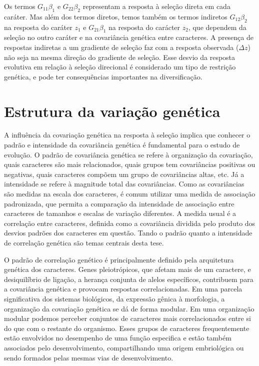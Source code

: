 \begin{refsection}
Os termos $G_{11}\beta_{1}$ e $G_{22}\beta_{2}$ representam a resposta à
seleção direta em cada caráter. Mas além dos termos diretos, temos também  os
termos indiretos $G_{12}\beta_{2}$ na resposta do caráter $z_1$ e
$G_{21}\beta_{1}$ na resposta do carácter $z_2$, que dependem da seleção no
outro caráter e na covariância genética entre caracteres. A presença de
respostas indiretas a um gradiente de seleção faz com a resposta observada
($\Delta z$) não seja na mesma direção do gradiente de seleção. Esse desvio da
resposta evolutiva em relação à seleção direcional é considerado um tipo de
restrição genética, e pode ter consequências importantes na diversificação.

\section{Estrutura da variação genética}

A influência da covariação genética na resposta à seleção implica que conhecer
o padrão e intensidade da covariância genética é fundamental para o estudo de
evolução. O padrão de covariância genética se refere à organização da
covariação, quais caracteres são mais relacionados, quais grupos tem
covariâncias positivas ou negativas, quais caracteres compõem um grupo de
covariâncias altas, etc. Já a intensidade se refere à magnitude total das
covariâncias. Como as covariâncias são medidas na escala dos caracteres, é
comum utilizar uma medida de associação padronizada, que permita a comparação
da intensidade de associação entre caracteres de tamanhos e escalas de
variação diferentes. A medida usual é a correlação entre caracteres, definida
como a covariância dividida pelo produto dos desvios padrões dos caracteres em
questão. Tando o padrão quanto a intensidade de correlação genética são temas
centrais desta tese.

O padrão de correlação genético é principalmente definido pela arquitetura
genética dos caracteres. Genes pleiotrópicos, que afetam mais de um caractere,
e desiquilíbrio de ligação, a herança conjunta de alelos específicos,
contribuem para a covariância genética e provocam respostas correlacionadas.
Em uma parcela significativa dos sistemas biológicos, da expressão gênica à
morfologia, a organização da covariação genética se dá de forma modular. Em
uma organização modular podemos perceber conjuntos de caracteres mais
correlacionados entre si do que com o restante do organismo. Esses grupos de
caracteres frequentemente estão envolvidos no desempenho de uma função
especifica e estão também associados pelo desenvolvimento, compartilhando uma
origem embriológica ou sendo formados pelas mesmas vias de desenvolvimento. 


\end{refsection}
